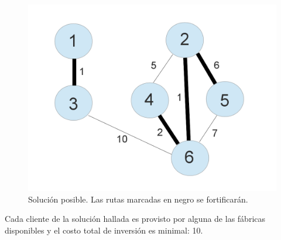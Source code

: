 \begin{figure}[H]
\center
\includegraphics[scale=0.3]{ej3/imgs/graph1_sol.png}
\caption[Long caption]{Solución posible. Las rutas marcadas en negro se fortificarán.}
\label{pic-a}
\end{figure}

Cada cliente de la solución hallada es provisto por alguna de las fábricas disponibles y el costo total de inversión es minimal: 10.

